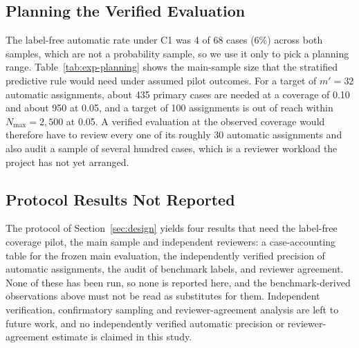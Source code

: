 \subsection{Planning the Verified Evaluation}
\label{sec:res-planning}

The label-free automatic rate under C1 was 4 of 68 cases (6\%) across both samples, which are not a probability sample, so we use it only to pick a planning range. Table~\ref{tab:exp-planning} shows the main-sample size that the stratified predictive rule would need under assumed pilot outcomes. For a target of $m'=32$ automatic assignments, about 435 primary cases are needed at a coverage of 0.10 and about 950 at 0.05, and a target of 100 assignments is out of reach within $N_{\max}=2{,}500$ at 0.05. A verified evaluation at the observed coverage would therefore have to review every one of its roughly 30 automatic assignments and also audit a sample of several hundred cases, which is a reviewer workload the project has not yet arranged.

\subsection{Protocol Results Not Reported}
\label{sec:res-pending}
The protocol of Section~\ref{sec:design} yields four results that need the label-free coverage pilot, the main sample and independent reviewers: a case-accounting table for the frozen main evaluation, the independently verified precision of automatic assignments, the audit of benchmark labels, and reviewer agreement. None of these has been run, so none is reported here, and the benchmark-derived observations above must not be read as substitutes for them. Independent verification, confirmatory sampling and reviewer-agreement analysis are left to future work, and no independently verified automatic precision or reviewer-agreement estimate is claimed in this study.
